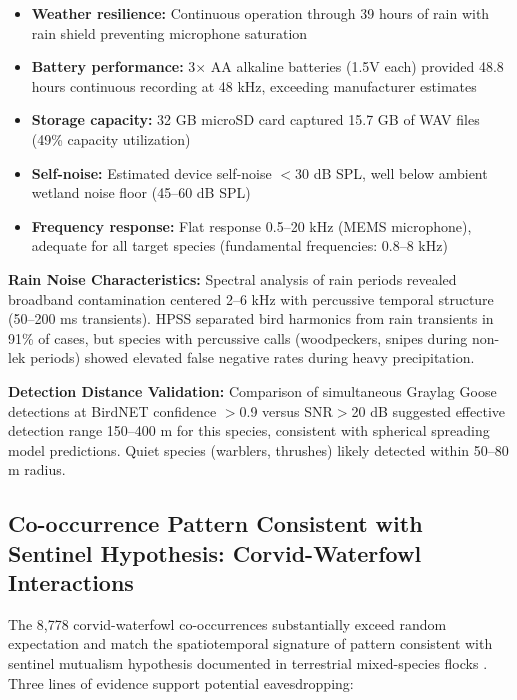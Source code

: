 \documentclass[twocolumn]{article}
\begin{document}
\begin{itemize}
\item \textbf{Weather resilience:} Continuous operation through 39 hours of rain with rain shield preventing microphone saturation
\item \textbf{Battery performance:} 3× AA alkaline batteries (1.5V each) provided 48.8 hours continuous recording at 48 kHz, exceeding manufacturer estimates
\item \textbf{Storage capacity:} 32 GB microSD card captured 15.7 GB of WAV files (49\% capacity utilization)
\item \textbf{Self-noise:} Estimated device self-noise $<$30 dB SPL, well below ambient wetland noise floor (45--60 dB SPL)
\item \textbf{Frequency response:} Flat response 0.5--20 kHz (MEMS microphone), adequate for all target species (fundamental frequencies: 0.8--8 kHz)
\end{itemize}

\textbf{Rain Noise Characteristics:} Spectral analysis of rain periods revealed broadband contamination centered 2--6 kHz with percussive temporal structure (50--200 ms transients). HPSS separated bird harmonics from rain transients in 91\% of cases, but species with percussive calls (woodpeckers, snipes during non-lek periods) showed elevated false negative rates during heavy precipitation.

\textbf{Detection Distance Validation:} Comparison of simultaneous Graylag Goose detections at BirdNET confidence $>$0.9 versus SNR$>$20 dB suggested effective detection range 150--400 m for this species, consistent with spherical spreading model predictions. Quiet species (warblers, thrushes) likely detected within 50--80 m radius.

\subsection{Co-occurrence Pattern Consistent with Sentinel Hypothesis: Corvid-Waterfowl Interactions}

The 8,778 corvid-waterfowl co-occurrences substantially exceed random expectation and match the spatiotemporal signature of pattern consistent with sentinel mutualism hypothesis documented in terrestrial mixed-species flocks \citep{Magrath2015}. Three lines of evidence support potential eavesdropping:
\end{document}
